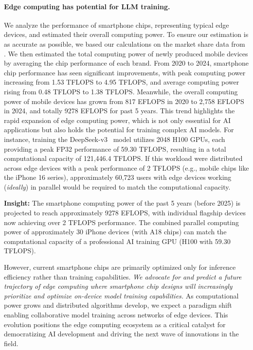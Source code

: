 \paragraph{Edge computing has potential for LLM training.}
We analyze the performance of smartphone chips, representing typical edge devices, and estimated their overall computing power.
To ensure our estimation is as accurate as possible, we based our calculations on the market share data from \cite{canalys2025}.
We then estimated the total computing power of newly produced mobile devices by averaging the chip performance of each brand.
From 2020 to 2024, smartphone chip performance has seen significant improvements, with peak computing power increasing from 1.53 TFLOPS to 4.95 TFLOPS, and average computing power rising from 0.48 TFLOPS to 1.38 TFLOPS. Meanwhile, the overall computing power of mobile devices has grown from 817 EFLOPS in 2020 to 2,758 EFLOPS in 2024, and totally 9278 EFLOPS for past 5 years. This trend highlights the rapid expansion of edge computing power, which is not only essential for AI applications but also holds the potential for training complex AI models.
For instance, training the DeepSeek-v3~\cite{liu2024deepseek} model utilizes 2048 H100 GPUs, each providing a peak FP32 performance of 59.30 TFLOPS, resulting in a total computational capacity of 121,446.4 TFLOPS. If this workload were distributed across edge devices with a peak performance of 2 TFLOPS (e.g., mobile chips like the iPhone 16 series), approximately 60,723 users with edge devices working (\textit{ideally}) in parallel would be required to match the computational capacity. 

\begin{insights}
    \textbf{Insight:} 
    The smartphone computing power of the past 5 years (before 2025) is projected to reach approximately 9278 EFLOPS, with individual flagship devices now achieving over 2 TFLOPS performance. The combined parallel computing power of approximately 30 iPhone devices (with A18 chips) can match the computational capacity of a professional AI training GPU (H100 with 59.30 TFLOPS). 
\end{insights}

However, current smartphone chips are primarily optimized only for inference efficiency rather than training capabilities. 
\textit{We advocate for and predict a future trajectory of edge computing where smartphone chip designs will increasingly prioritize and optimize on-device model training capabilities.
}
As computational power grows and distributed algorithms develop, we expect a paradigm shift enabling collaborative model training across networks of edge devices. This evolution positions the edge computing ecosystem as a critical catalyst for democratizing AI development and driving the next wave of innovations in the field.



